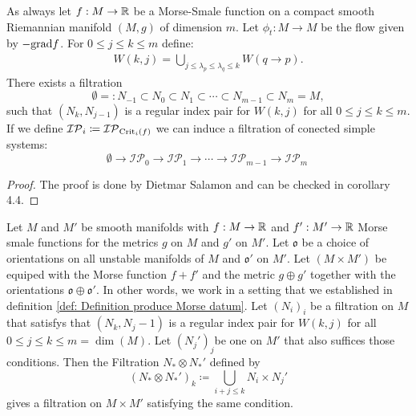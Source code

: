 \begin{definition} \label{def: Regular index pairs and a filtration on M } \label{def: Regular index pairs and a filtration on M}
	As always let $f:M\to \mathbb{R}$ be a Morse-Smale function on a compact smooth Riemannian manifold $(M,g)$ of dimension $m$. Let $\phi_t:M\to M$ be the flow given by $-\mathrm{grad} f$. For $0\leq j\leq k\leq m$ define:
	\begin{align*}
		W(k,j)=\bigcup_{j\leq \lambda_p \leq \lambda_q\leq k} W(q \to p).
	\end{align*}There exists a filtration
	\begin{equation} \label{eq: Filtration conley}
		\emptyset=:N_{-1}\subset N_0\subset N_1\subset \cdots \subset N_{m-1}\subset N_m=M,
	\end{equation} such that $(N_k,N_{j-1})$ is a regular index pair for $W(k,j)$ for all $0\leq j \leq k\leq m$. If we define $\mathcal{IP}_i\coloneq \mathcal{IP}_{\mathrm{Crit}_i(f)}$ we can induce a filtration of conected simple systems:
	\begin{equation*}
		\emptyset \to \mathcal{IP}_0\to \mathcal{IP}_1 \to \cdots \to \mathcal{IP}_{m-1} \to \mathcal{IP}_m \
	\end{equation*} 
\end{definition}
\begin{proof}
	The proof is done by Dietmar Salamon and can be checked in \cite{Salamon1985} corollary 4.4. 
\end{proof}
\begin{remark}
	Let $M$ and $M'$ be smooth manifolds with $f:M\to \mathbb{R}$ and $f':M'\to \mathbb{R}$ Morse smale functions for the metrics $g$ on $M$ and $g'$ on $M'$. Let $\mathfrak{o}$ be a choice of orientations on all unstable manifolds of $M$ and $\mathfrak{o}'$ on $M'$. Let $(M\times M')$ be equiped with the Morse function $f+f'$ and the metric $g\oplus g'$ together with the orientations $\mathfrak{o}\oplus \mathfrak{o}'$. In other words, we work in a setting that we established in definition \ref{def: Definition produce Morse datum}. Let $(N_i)_i$  be a filtration on $M$ that satisfys that $(N_k,N_j-1)$ is a regular index pair for $W(k,j)$ for all $0\leq j\leq k\leq m=\dim(M)$. Let  $(N_j')_j$be one on $M'$ that also suffices those conditions. Then the Filtration
	$N_*\otimes N_*'$ defined by
	\begin{equation*}
		(N_*\otimes N_*')_k\coloneq \bigcup_{i+j\leq k}N_i\times N_{j}'
	\end{equation*} gives a filtration on $M\times M'$ satisfying the same condition. 
\end{remark}


